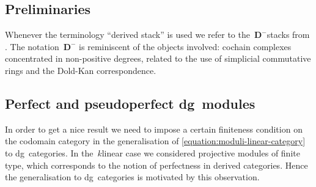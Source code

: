 \begin{refsection}
\section{Preliminaries}
\label{section:preliminaries}
Whenever the terminology ``derived stack'' is used we refer to the~$\mathbf{D}^-$\dash stacks from \cite{hagII}. The notation~$\mathbf{D}^-$ is reminiscent of the objects involved: cochain complexes concentrated in non-positive degrees, related to the use of simplicial commutative rings and the Dold-Kan correspondence.

\subsection{Perfect and pseudoperfect dg~modules}
In order to get a nice result we need to impose a certain finiteness condition on the codomain category in the generalisation of \eqref{equation:moduli-linear-category} to dg~categories. In the~$k$\dash linear case we considered projective modules of finite type, which corresponds to the notion of perfectness in derived categories. Hence the generalisation to dg~categories is motivated by this observation.


\end{refsection}
